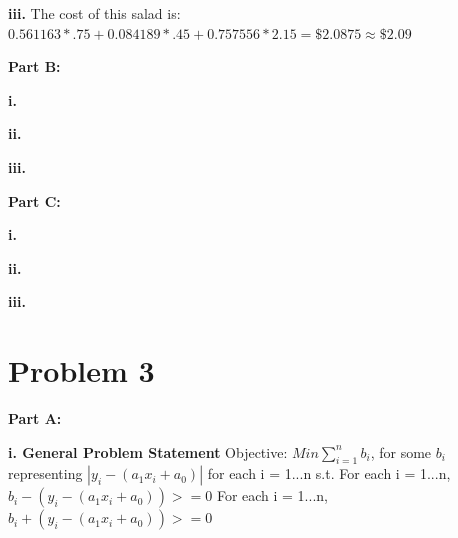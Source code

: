 \documentclass[paper=a4, fontsize=11pt]{scrartcl} %
\numberwithin{equation}{section} %
\numberwithin{figure}{section} %
\numberwithin{table}{section} %
\begin{document}
    \textbf{iii.}
    The cost of this salad is: $0.561163 * .75 + 0.084189 * .45  + 0.757556 * 2.15 = \$2.0875 \approx \$2.09$
    
\textbf{Part B:}
    
    \textbf{i.}
    
    \textbf{ii.}
    
    \textbf{iii.}
    
\textbf{Part C:}
	
    \textbf{i.}
    
    \textbf{ii.}
    
    \textbf{iii.}
    
\section{Problem 3}
\textbf{Part A:}

    \textbf{i. General Problem Statement}\newline
	Objective:\newline    
    $Min \sum_{i=1}^{n}{b_i}$, for some $b_i$ representing $|y_i - (a_1x_i + a_0)|$ for each i = 1...n\newline
    s.t.\newline
    For each i = 1...n, $b_i - (y_i - (a_1x_i + a_0)) >= 0$\newline
    For each i = 1...n, $b_i + (y_i - (a_1x_i + a_0)) >= 0$\newline
    
\end{document}
